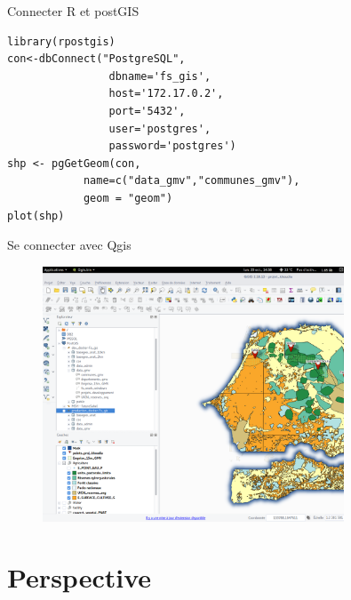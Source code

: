 \documentclass[newPxFont]{beamer}
\begin{document}
\begin{frame}[fragile]{Connecter R et postGIS}
\vspace{-2em}
\begin{verbatim}
library(rpostgis)
con<-dbConnect("PostgreSQL",
                dbname='fs_gis',
                host='172.17.0.2',
                port='5432',
                user='postgres',
                password='postgres')
shp <- pgGetGeom(con,
            name=c("data_gmv","communes_gmv"),
            geom = "geom")
plot(shp)
\end{verbatim}
\end{frame}
\begin{frame}[c]{Se connecter avec Qgis}
\vspace{-2em}
\begin{figure}
	\centering
	\includegraphics[width = 0.8\textwidth]{img/qgis_screenshot}
\end{figure}
\end{frame}

\section{Perspective}
\end{document}
